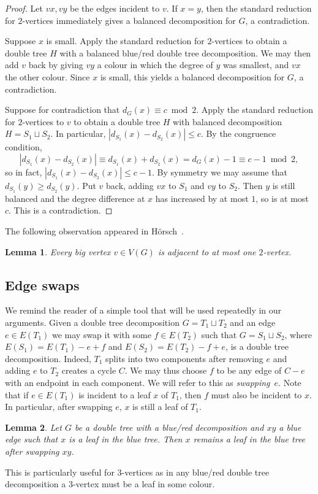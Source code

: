 \documentclass[11pt, reqno, a4paper]{article}
\newtheorem{lemma}{Lemma}[section]
\theoremstyle{definition}
\numberwithin{equation}{section}
\renewcommand{\leq}{\leqslant}
\renewcommand{\geq}{\geqslant}
\begin{document}
\begin{proof}
Let \(vx, vy\) be the edges incident to \(v\). If \(x = y\), then the standard reduction for \mbox{$2$-vertices} immediately gives a balanced decomposition for $G$, a contradiction.

Suppose \(x\) is small. Apply the standard reduction for $2$-vertices to obtain a double tree $H$ with a balanced blue/red double tree decomposition.
We may then add $v$ back by giving $vy$ a colour in which the degree of $y$ was smallest, and $vx$ the other colour.
Since $x$ is small, this yields a balanced decomposition for $G$, a contradiction.

Suppose for contradiction that $d_G(x)\equiv c \bmod{2}$.
Apply the standard reduction for \mbox{$2$-vertices} to $v$ to obtain a double tree $H$ with balanced decomposition $H= S_1\sqcup S_2$.
In particular, $| d_{S_1}(x) - d_{S_2}(x) | \leq c$. 
By the congruence condition,
\begin{equation*}
|d_{S_1}(x) - d_{S_2}(x) | \equiv 
d_{S_1}(x) + d_{S_2}(x)  = d_G(x) -1 \equiv c-1 \bmod{2},
\end{equation*}
so in fact, $|d_{S_1}(x) - d_{S_2}(x)| \leq c-1$. By symmetry we may assume that \(d_{S_1}(y) \geq d_{S_2}(y)\). Put \(v\) back, adding \(vx\) to \(S_1\) and \(vy\) to \(S_2\). Then \(y\) is still balanced and the degree difference at \(x\) has increased by at most \(1\), so is at most \(c\). This is a contradiction.
\end{proof}

The following observation appeared in H\"orsch~\cite[Lemma 2]{horsch2021globally}.

\begin{lemma}\label{lem:atmostone2vert}
Every big vertex $v\in V(G)$ is adjacent to at most one $2$-vertex. 
\end{lemma}

\subsection{Edge swaps}
We remind the reader of a simple tool that will be used repeatedly in our arguments.
Given a double tree decomposition $G= T_1\sqcup T_2$ and an edge $e\in E(T_1)$ we may swap it with some $f\in E(T_2)$ such that 
$G= S_1\sqcup S_2$,
where $E(S_1) = E(T_1) - e +f$ and $E(S_2)= E(T_2) - f +e$,
is a double tree decomposition.
Indeed, $T_1$ splits into two components after removing $e$ and adding $e$ to $T_2$ creates a cycle $C$.
We may thus choose $f$ to be any edge of $C - e$ with an endpoint in each component.
We will refer to this as \textit{swapping}~$e$.
Note that if $e \in E(T_1)$ is incident to a leaf $x$ of $T_1$, then $f$ must also be incident to $x$.
In particular, after swapping $e$, $x$ is still a leaf of $T_1$.
\begin{lemma}\label{lem:edgeswap}
Let $G$ be a double tree with a blue/red decomposition and $xy$ a blue edge such that $x$ is a leaf in the blue tree.
Then $x$ remains a leaf in the blue tree after swapping $xy$.
\end{lemma}
This is particularly useful for $3$-vertices as in any blue/red double tree decomposition a $3$-vertex must be a leaf in some colour.
\end{document}
